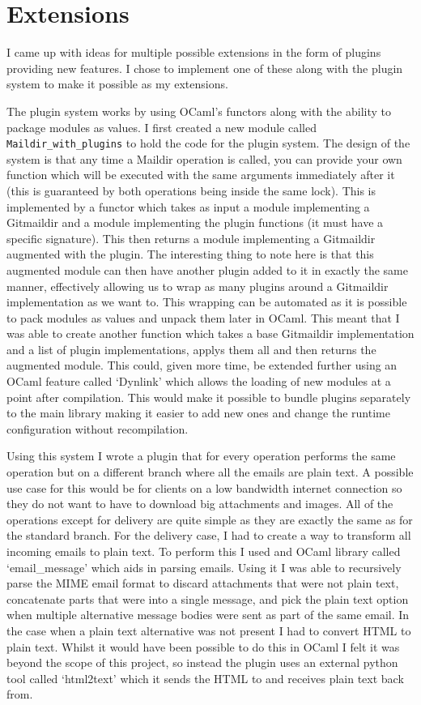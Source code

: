 \section{Extensions} \label{section:extensions}

I came up with ideas for multiple possible extensions in the form of plugins providing new features. I chose to implement one of these along with the plugin system to make it possible as my extensions.

The plugin system works by using OCaml's functors along with the ability to package modules as values. I first created a new module called \texttt{Maildir\_with\_plugins} to hold the code for the plugin system. The design of the system is that any time a Maildir operation is called, you can provide your own function which will be executed with the same arguments immediately after it (this is guaranteed by both operations being inside the same lock). This is implemented by a functor which takes as input a module implementing a Gitmaildir and a module implementing the plugin functions (it must have a specific signature). This then returns a module implementing a Gitmaildir augmented with the plugin. The interesting thing to note here is that this augmented module can then have another plugin added to it in exactly the same manner, effectively allowing us to wrap as many plugins around a Gitmaildir implementation as we want to. This wrapping can be automated as it is possible to pack modules as values and unpack them later in OCaml. This meant that I was able to create another function which takes a base Gitmaildir implementation and a list of plugin implementations, applys them all and then returns the augmented module. This could, given more time, be extended further using an OCaml feature called `Dynlink' which allows the loading of new modules at a point after compilation. This would make it possible to bundle plugins separately to the main library making it easier to add new ones and change the runtime configuration without recompilation.

Using this system I wrote a plugin that for every operation performs the same operation but on a different branch where all the emails are plain text. A possible use case for this would be for clients on a low bandwidth internet connection so they do not want to have to download big attachments and images. All of the operations except for delivery are quite simple as they are exactly the same as for the standard branch. For the delivery case, I had to create a way to transform all incoming emails to plain text. To perform this I used and OCaml library called `email\_message' which aids in parsing emails. Using it I was able to recursively parse the MIME email format to discard attachments that were not plain text, concatenate parts that were into a single message, and pick the plain text option when multiple alternative message bodies were sent as part of the same email. In the case when a plain text alternative was not present I had to convert HTML to plain text. Whilst it would have been possible to do this in OCaml I felt it was beyond the scope of this project, so instead the plugin uses an external python tool called `html2text' which it sends the HTML to and receives plain text back from.

